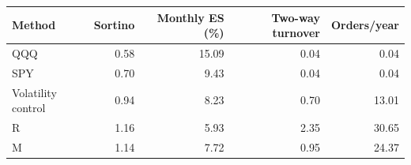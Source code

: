\begin{tabular}{@{}lrrrr@{}}\toprule
Method & Sortino & Monthly ES (\%) & Two-way turnover & Orders/year\\\midrule
QQQ & 0.58 & 15.09 & 0.04 & 0.04\\
SPY & 0.70 & 9.43 & 0.04 & 0.04\\
Volatility control & 0.94 & 8.23 & 0.70 & 13.01\\
R & 1.16 & 5.93 & 2.35 & 30.65\\
M & 1.14 & 7.72 & 0.95 & 24.37\\
\bottomrule
\end{tabular}
